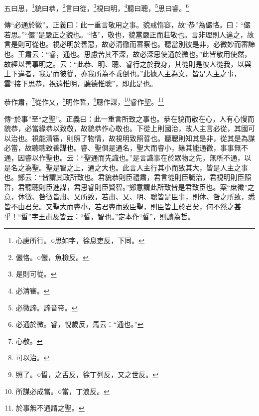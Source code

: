 五曰思，\footnote{心慮所行。○思如字，徐息吏反，下同。}貌曰恭，\footnote{儼恪。○儼，魚檢反。}言曰從，\footnote{是則可從。}視曰明，\footnote{必清審。}聽曰聰，\footnote{必微諦。諦音帝。}思曰睿。\footnote{必通於微。睿，悅歲反，馬云：“通也。”}


{\noindent\zhuan{}\fzbyks 傳“必通於微”。正義曰：此一重言敬用之事。貌戒惰容，故“恭”為儼恪。曰：“儼若思。”“儼”是嚴正之貌也。“恪”，敬也，貌當嚴正而莊敬也。言非理則人違之，故言是則可從也。視必明於善惡，故必清徹而審察也。聽當別彼是非，必微妙而審諦也。王肅云：“睿，通也。思慮苦其不深，故必深思使通於微也。”此皆敬用使然，故經以善事明之。云：“此恭、明、聰、睿行之於我身，其從則是彼人從我，以與上下違者，我是而彼從，亦我所為不乖倒也。”此據人主為文，皆是人主之事，雲“接下思恭，視遠惟明，聽德惟聰”，即此是也。 \par}

恭作肅，\footnote{心敬。}從作乂，\footnote{可以治。}明作晢，\footnote{照了。○晢，之舌反，徐丁列反，又之世反。}聰作謀，\footnote{所謀必成當。○當，丁浪反。}睿作聖。\footnote{於事無不通謂之聖。}

{\noindent\zhuan{}\fzbyks 傳“於事”至“之聖”。正義曰：此一重言所致之事也。恭在貌而敬在心，人有心慢而貌恭，必當緣恭以致敬，故貌恭作心敬也。下從上則國治，故人主言必從，其國可以治也。視能清審，則照了物情，故視明致照晢也。聽聰則知其是非，從其是為謀必當，故聽聰致善謀也。睿、聖俱是通名，聖大而睿小，緣其能通微，事事無不通，因睿以作聖也。云：“聖通而先識也。”是言識事在於眾物之先，無所不通，以是名之為聖。聖是智之上，通之大也。此言人主行其小而致其大，皆是人主之事也。鄭云：“皆謂其政所致也。君貌恭則臣禮肅，君言從則臣職治，君視明則臣照晢，君聽聰則臣進謀，君思睿則臣賢智。”鄭意謂此所致皆是君致臣也。案“庶徵”之意，休徵、咎徵皆肅、乂所致，若肅、乂、明、聰皆是臣事，則休、咎之所致，悉皆不由君矣。又聖大而睿小，若君睿而致臣聖，則臣皆上於君矣，何不然之甚乎！“晢”字王肅及皆云：“晢，智也。”定本作“晢”，則讀為哲。 \par}

